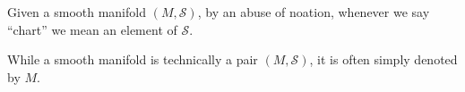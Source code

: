 \documentclass{ximera}
\begin{document}
    
    \begin{notation}
    Given a smooth manifold $(M, \mathcal{S})$, by an abuse of noation, whenever we say ``chart'' we mean an element of $\mathcal{S}$.    
    \end{notation}




    \begin{notation}
        While a smooth manifold is technically a pair $(M , \mathcal{S})$, it is often simply denoted by $M$. 
    \end{notation}
\end{document}
